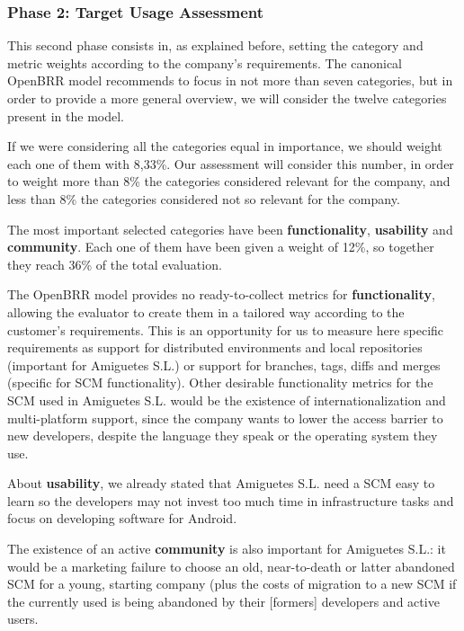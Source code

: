 \documentclass[a4paper,10pt]{article}
\begin{document}
\subsubsection{Phase 2: Target Usage Assessment}
This second phase consists in, as explained before, setting the category and
metric weights according to the company's requirements. The canonical OpenBRR
model recommends to focus in not more than seven categories, but in order to
provide a more general overview, we will consider the twelve categories present
in the model.

If we were considering all the categories equal in importance, we should weight
each one of them with 8,33\%. Our assessment will consider this number, in
order to weight more than 8\% the categories considered relevant for the
company, and less than 8\% the categories considered not so relevant for the
company.

The most important selected categories have been \textbf{functionality},
\textbf{usability} and \textbf{community}. Each one of them have been given a
weight of 12\%, so together they reach 36\% of the total evaluation.


The OpenBRR model provides no ready-to-collect metrics for
\textbf{functionality}, allowing the evaluator to create them in a tailored way
according to the customer's requirements. This is an opportunity for us to
measure here specific requirements as support for distributed environments and
local repositories (important for Amiguetes S.L.) or support for branches, tags,
diffs and merges (specific for SCM functionality). Other desirable functionality
metrics for the SCM used in Amiguetes S.L. would be the existence of
internationalization and multi-platform support, since the company wants to
lower the access barrier to new developers, despite the language they speak or
the operating system they use.


About \textbf{usability}, we already stated that Amiguetes S.L. need a SCM easy
to learn so the developers may not invest too much time in infrastructure tasks
and focus on developing software for Android.


The existence of an active \textbf{community} is also important for Amiguetes
S.L.: it would be a marketing failure to choose an old, near-to-death or
latter abandoned SCM for a young, starting company (plus the costs of migration
to a new SCM if the currently used is being abandoned by their
[formers] developers and active users.
\end{document}
